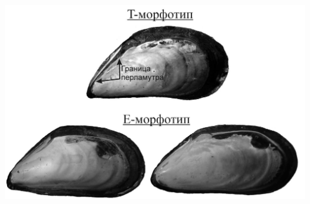 \documentclass[20pt,a0,portrait]{a0poster}
\begin{document}
\begin{minipage}[t]{0.5\linewidth}
\begin{minipage}[b]{0.4\linewidth}
\end{minipage}\hspace{1cm}
%
\begin{minipage}[t]{0.5\linewidth}
	\begin{center} 
			\includegraphics[width=0.6\linewidth]{Morphotypes1.jpg}
			\label{Figmorph}
		\end{center}\vspace{0.5cm}
\end{minipage}


\end{minipage}
%
\end{document}
